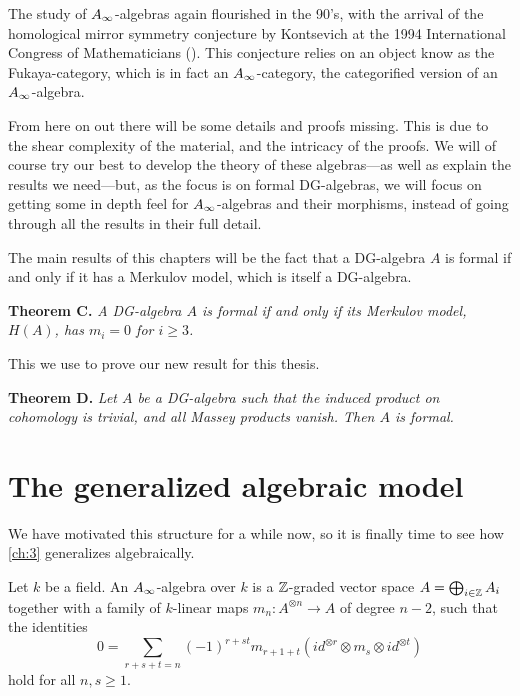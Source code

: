 The study of $A_{\infty}$-algebras again flourished in the 90's, with the arrival of the homological mirror symmetry conjecture by Kontsevich at the 1994 International Congress of Mathematicians (\cite{kontsevich}). This conjecture relies on an object know as the Fukaya-category, which is in fact an $A_{\infty}$-category, the categorified version of an $A_{\infty}$-algebra.

From here on out there will be some details and proofs missing. This is due to the shear complexity of the material, and the intricacy of the proofs. We will of course try our best to develop the theory of these algebras---as well as explain the results we need---but, as the focus is on formal DG-algebras, we will focus on getting some in depth feel for $A_{\infty}$-algebras and their morphisms, instead of going through all the results in their full detail.

The main results of this chapters will be the fact that a DG-algebra $A$ is formal if and only if it has a Merkulov model, which is itself a DG-algebra. 

\textbf{Theorem C.} \textit{A DG-algebra $A$ is formal if and only if its Merkulov model, $H(A)$, has $m_i=0$ for $i\geq 3$.}

This we use to prove our new result for this thesis. 

\textbf{Theorem D.} \textit{Let $A$ be a DG-algebra such that the induced product on cohomology is trivial, and all Massey products vanish. Then $A$ is formal.}

\section{The generalized algebraic model}

We have motivated this structure for a while now, so it is finally time to see how \cref{ch:3} generalizes algebraically.

\begin{definition}
\label{def:A_infinity-algebra}
Let $k$ be a field. An $A_{\infty}$-algebra over $k$ is a $\mathbb{Z}$-graded vector space $A=\bigoplus_{i\in \mathbb{Z}}A_i$ together with a family of $k$-linear maps $m_n : A^{\otimes n}\longrightarrow A$ of degree $n-2$, such that the identities 
\begin{equation*}
    0=\sum_{r+s+t = n}(-1)^{r+st}m_{r+1+t}(id^{\otimes r}\otimes m_s \otimes id^{\otimes t})
\end{equation*}
hold for all $n, s\geq 1$. 
\end{definition}

